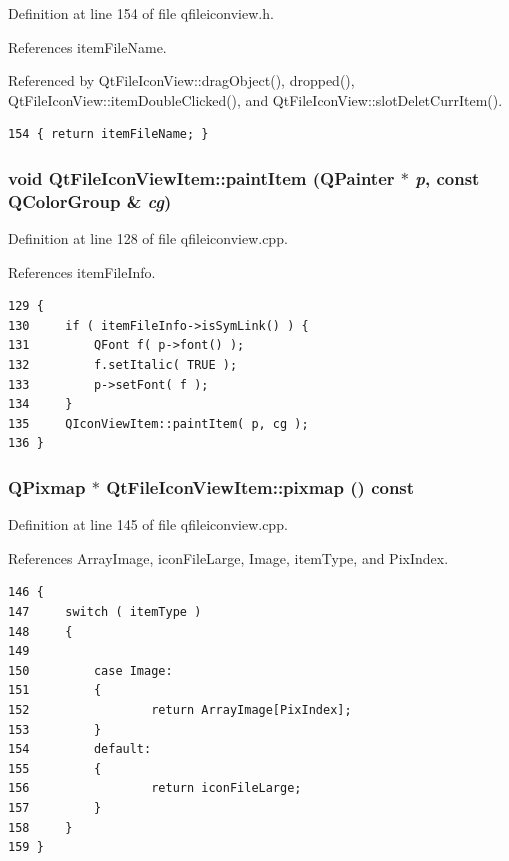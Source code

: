 Definition at line 154 of file qfileiconview.h.

References item\-File\-Name.

Referenced by Qt\-File\-Icon\-View::drag\-Object(), dropped(), Qt\-File\-Icon\-View::item\-Double\-Clicked(), and Qt\-File\-Icon\-View::slot\-Delet\-Curr\-Item().



\footnotesize\begin{verbatim}154 { return itemFileName; }
\end{verbatim}\normalsize 
{}
\subsubsection{\setlength{\rightskip}{0pt plus 5cm}void Qt\-File\-Icon\-View\-Item::paint\-Item (QPainter $\ast$ {\em p}, const QColor\-Group \& {\em cg})}\label{classQtFileIconViewItem_QtFileIconViewItema10}




Definition at line 128 of file qfileiconview.cpp.

References item\-File\-Info.



\footnotesize\begin{verbatim}129 {
130     if ( itemFileInfo->isSymLink() ) {
131         QFont f( p->font() );
132         f.setItalic( TRUE );
133         p->setFont( f );
134     }
135     QIconViewItem::paintItem( p, cg );
136 }
\end{verbatim}\normalsize 
{}
\subsubsection{\setlength{\rightskip}{0pt plus 5cm}QPixmap $\ast$ Qt\-File\-Icon\-View\-Item::pixmap () const\hspace{0.3cm}{\tt  [virtual]}}\label{classQtFileIconViewItem_QtFileIconViewItema6}




Definition at line 145 of file qfileiconview.cpp.

References Array\-Image, icon\-File\-Large, Image, item\-Type, and Pix\-Index.



\footnotesize\begin{verbatim}146 {
147     switch ( itemType ) 
148     {
149    
150         case Image:
151         {
152                 return ArrayImage[PixIndex];
153         }
154         default:
155         {
156                 return iconFileLarge;
157         }
158     }
159 }
\end{verbatim}\normalsize 
{}
